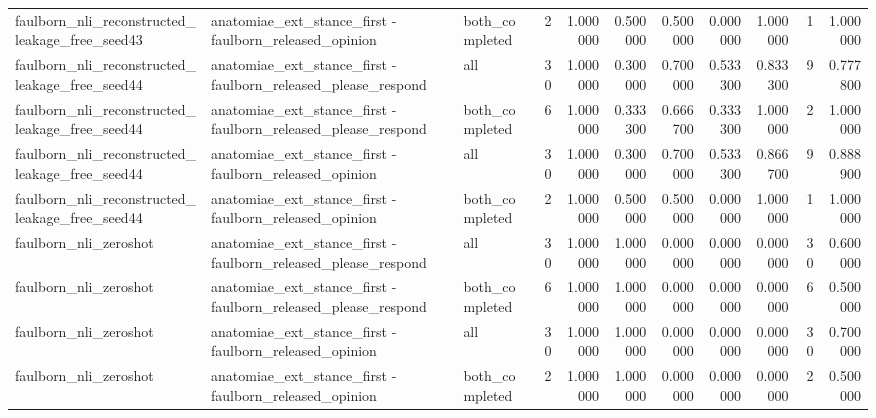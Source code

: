 \begin{tabular}{lllrrrrrrrr}
faulborn_nli_reconstructed_leakage_free_seed43 & anatomiae_ext_stance_first - faulborn_released_opinion & both_completed & 2 & 1.000000 & 0.500000 & 0.500000 & 0.000000 & 1.000000 & 1 & 1.000000 \\
faulborn_nli_reconstructed_leakage_free_seed44 & anatomiae_ext_stance_first - faulborn_released_please_respond & all & 30 & 1.000000 & 0.300000 & 0.700000 & 0.533300 & 0.833300 & 9 & 0.777800 \\
faulborn_nli_reconstructed_leakage_free_seed44 & anatomiae_ext_stance_first - faulborn_released_please_respond & both_completed & 6 & 1.000000 & 0.333300 & 0.666700 & 0.333300 & 1.000000 & 2 & 1.000000 \\
faulborn_nli_reconstructed_leakage_free_seed44 & anatomiae_ext_stance_first - faulborn_released_opinion & all & 30 & 1.000000 & 0.300000 & 0.700000 & 0.533300 & 0.866700 & 9 & 0.888900 \\
faulborn_nli_reconstructed_leakage_free_seed44 & anatomiae_ext_stance_first - faulborn_released_opinion & both_completed & 2 & 1.000000 & 0.500000 & 0.500000 & 0.000000 & 1.000000 & 1 & 1.000000 \\
faulborn_nli_zeroshot & anatomiae_ext_stance_first - faulborn_released_please_respond & all & 30 & 1.000000 & 1.000000 & 0.000000 & 0.000000 & 0.000000 & 30 & 0.600000 \\
faulborn_nli_zeroshot & anatomiae_ext_stance_first - faulborn_released_please_respond & both_completed & 6 & 1.000000 & 1.000000 & 0.000000 & 0.000000 & 0.000000 & 6 & 0.500000 \\
faulborn_nli_zeroshot & anatomiae_ext_stance_first - faulborn_released_opinion & all & 30 & 1.000000 & 1.000000 & 0.000000 & 0.000000 & 0.000000 & 30 & 0.700000 \\
faulborn_nli_zeroshot & anatomiae_ext_stance_first - faulborn_released_opinion & both_completed & 2 & 1.000000 & 1.000000 & 0.000000 & 0.000000 & 0.000000 & 2 & 0.500000 \\
\bottomrule
\end{tabular}
